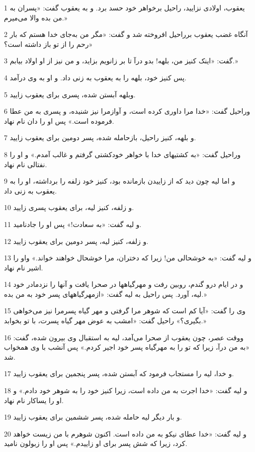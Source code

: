 \par 1 یعقوب، اولادی نزایید، راحیل برخواهر خود حسد برد. و به یعقوب گفت: «پسران به من بده والا می‌میرم.»
\par 2 آنگاه غضب یعقوب برراحیل افروخته شد و گفت: «مگر من به‌جای خدا هستم که بار رحم را از تو باز داشته است؟»
\par 3 گفت: «اینک کنیز من، بلهه! بدو درآ تا بر زانویم بزاید، و من نیز از او اولاد بیابم.»
\par 4 پس کنیز خود، بلهه را به یعقوب به زنی داد. و او به وی درآمد.
\par 5 وبلهه آبستن شده، پسری برای یعقوب زایید.
\par 6 وراحیل گفت: «خدا مرا داوری کرده است، و آوازمرا نیز شنیده، و پسری به من عطا فرموده است.» پس او را دان نام نهاد.
\par 7 و بلهه، کنیز راحیل، بازحامله شده، پسر دومین برای یعقوب زایید.
\par 8 وراحیل گفت: «به کشتیهای خدا با خواهر خودکشتی گرفتم و غالب آمدم.» و او را نفتالی نام نهاد.
\par 9 و اما لیه چون دید که از زاییدن باز‌مانده بود، کنیز خود زلفه را برداشته، او را به یعقوب به زنی داد.
\par 10 و زلفه، کنیز لیه، برای یعقوب پسری زایید.
\par 11 و لیه گفت: «به سعادت!» پس او را جادنامید.
\par 12 و زلفه، کنیز لیه، پسر دومین برای یعقوب زایید.
\par 13 و لیه گفت: «به خوشحالی من! زیرا که دختران، مرا خوشحال خواهند خواند.» واو را اشیر نام نهاد.
\par 14 و در ایام درو گندم، روبین رفت و مهرگیاهها در صحرا یافت و آنها را نزدمادر خود لیه، آورد. پس راحیل به لیه گفت: «ازمهرگیاههای پسر خود به من بده.»
\par 15 وی را گفت: «آیا کم است که شوهر مرا گرفتی و مهر گیاه پسرمرا نیز می‌خواهی بگیری؟» راحیل گفت: «امشب به عوض مهر گیاه پسرت، با تو بخوابد.»
\par 16 ووقت عصر، چون یعقوب از صحرا می‌آمد، لیه به استقبال وی بیرون شده، گفت: «به من درآ، زیرا که تو را به مهرگیاه پسر خود اجیر کردم.» پس آنشب با وی همخواب شد. 
\par 17 و خدا، لیه را مستجاب فرمود که آبستن شده، پسر پنجمین برای یعقوب زایید.
\par 18 و لیه گفت: «خدا اجرت به من داده است، زیرا کنیز خود را به شوهر خود دادم.» و او را یساکار نام نهاد.
\par 19 و بار دیگر لیه حامله شده، پسر ششمین برای یعقوب زایید.
\par 20 و لیه گفت: «خدا عطای نیکو به من داده است. اکنون شوهرم با من زیست خواهد کرد، زیرا که شش پسر برای او زاییدم.» پس او را زبولون نامید.

